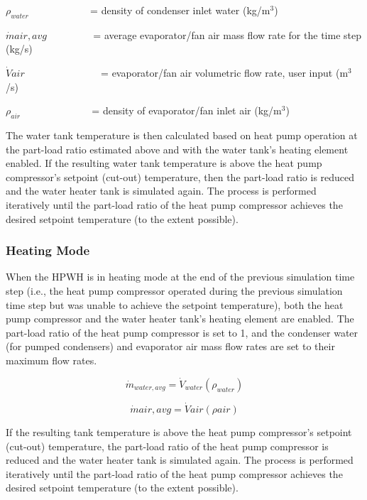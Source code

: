 \({\rho_{water}}\) ~~~~~~~~~~~ = density of condenser inlet water (kg/m\(^{3}\))

\(\dot mair,avg\) ~~~~~~~~ = average evaporator/fan air mass flow rate for the time step (kg/s)

\(\dot Vair\) ~~~~~~~~~~~~~~ = evaporator/fan air volumetric flow rate, user input (m\(^{3}\)/s)

\({\rho_{air}}\) ~~~~~~~~~~~~~ = density of evaporator/fan inlet air (kg/m\(^{3}\))

The water tank temperature is then calculated based on heat pump operation at the part-load ratio estimated above and with the water tank's heating element enabled. If the resulting water tank temperature is above the heat pump compressor's setpoint (cut-out) temperature, then the part-load ratio is reduced and the water heater tank is simulated again. The process is performed iteratively until the part-load ratio of the heat pump compressor achieves the desired setpoint temperature (to the extent possible).

\subsubsection{Heating Mode}\label{heating-mode-000}

When the HPWH is in heating mode at the end of the previous simulation time step (i.e., the heat pump compressor operated during the previous simulation time step but was unable to achieve the setpoint temperature), both the heat pump compressor and the water heater tank's heating element are enabled. The part-load ratio of the heat pump compressor is set to 1, and the condenser water (for pumped condensers) and evaporator air mass flow rates are set to their maximum flow rates.

\begin{equation}
{\dot m_{water,avg}} = {\dot V_{water}}\left( {{\rho_{water}}} \right)
\end{equation}

\begin{equation}
\dot mair,avg = \dot Vair\left( {\rho air} \right)
\end{equation}

If the resulting tank temperature is above the heat pump compressor's setpoint (cut-out) temperature, the part-load ratio of the heat pump compressor is reduced and the water heater tank is simulated again. The process is performed iteratively until the part-load ratio of the heat pump compressor achieves the desired setpoint temperature (to the extent possible).

